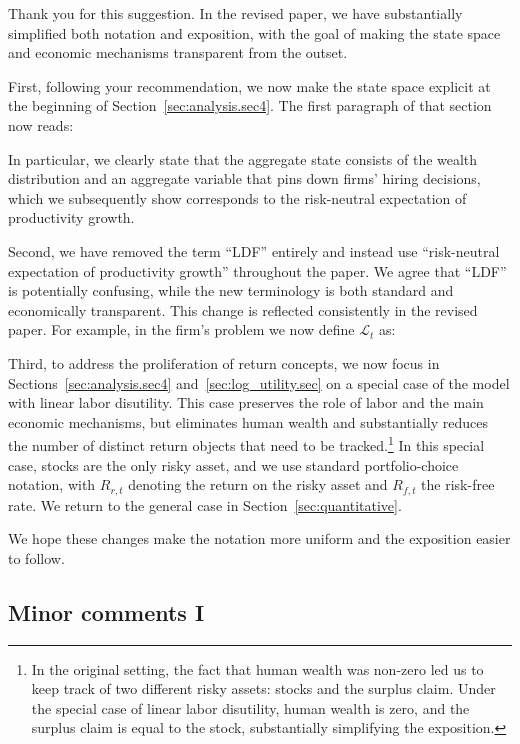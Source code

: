 \documentclass[12pt,a4paper]{article}
\newcommand{\changesbox}[1]{
	\noindent\vspace{-8pt}
\begin{mdframed}[style=manuscript] 
	#1
\end{mdframed}}
\begin{document}
Thank you for this suggestion. In the revised paper, we have substantially simplified
both notation and exposition, with the goal of making the state space and economic
mechanisms transparent from the outset.

First, following your recommendation, we now make the state space explicit at the
beginning of Section~\ref{sec:analysis.sec4}. The first paragraph of that section now
reads:

\changesbox{
}
In particular, we clearly state that the aggregate state consists of the wealth
distribution and an aggregate variable that pins down firms' hiring decisions, which
we subsequently show corresponds to the risk-neutral expectation of productivity
growth.

Second, we have removed the term ``LDF'' entirely and instead use
``risk-neutral expectation of productivity growth'' throughout the paper. We agree
that ``LDF'' is potentially confusing, while the new terminology is both standard and
economically transparent. This change is reflected consistently in the revised paper.
For example, in the firm's problem we now define $\mathcal L_t$ as:
\changesbox{
}

Third, to address the proliferation of return concepts, we now focus in
Sections~\ref{sec:analysis.sec4} and~\ref{sec:log_utility.sec} on a special case of the
model with linear labor disutility. This case preserves the role of labor and the main
economic mechanisms, but eliminates human wealth and substantially reduces the number
of distinct return objects that need to be tracked.\footnote{In the original setting, the fact that human wealth was non-zero led us to keep track of two different risky assets: stocks and the surplus claim. 
Under the special case of linear labor disutility, human wealth is zero, and the surplus claim is equal to the stock, substantially simplifying the exposition.
} In this special case, stocks are
the only risky asset, and we use standard portfolio-choice notation, with $R_{r,t}$
denoting the return on the risky asset and $R_{f,t}$ the risk-free rate. We return to
the general case in Section~\ref{sec:quantitative}.

We hope these changes make the notation more uniform and the exposition easier to
follow.

\subsection*{Minor comments I}
\end{document}
